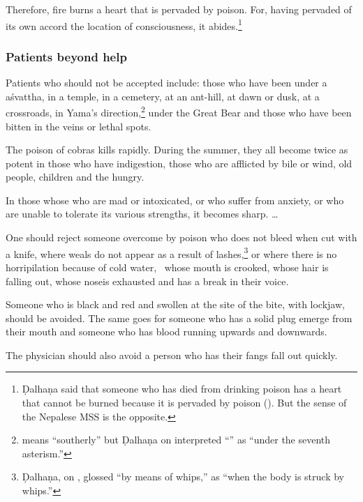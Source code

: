 \begin{translation}[resume]
\item[37]

Therefore, fire burns a heart that is pervaded by poison. For, having pervaded
of its own accord  the location of consciousness, it abides.\footnote{Ḍalhaṇa
    said that someone who has died from drinking poison has a heart that cannot
    be burned because it is pervaded by poison ().
    But the sense of the Nepalese MSS is the opposite.}

\subsubsection{Patients beyond help}

\item[38] Patients who should not be accepted include: those who have been
 under a \gls{aśvattha}, in a temple, in a cemetery, at an 
ant-hill, at
dawn or dusk, at a crossroads, in Yama's direction,\footnote{ means
    “southerly” but Ḍalhaṇa on  interpreted “” as “under the seventh asterism.”} under the Great Bear and 
    those who have been bitten in the veins or lethal spots.

\item[39]

The poison of cobras kills rapidly.  During the summer, they all become twice as 
potent in those who have indigestion, those who are afflicted by bile or wind, old 
people, children and the hungry.

\item[39.1]

In those whose who are mad or intoxicated, or who suffer from anxiety, or who
are unable to tolerate its various strengths, it becomes sharp.
\dag \ldots

\item[39.2]

\item [3.40cd--3.41]

One should reject someone overcome by poison who does not bleed when cut with
a knife, where weals do not appear as a result of lashes,\footnote{Ḍalhaṇa, on
    , glossed  “by means of whips,” as “when the
    body is struck by whips.”} %
    or where there is no horripilation because of cold water, \dag\ whose
    mouth is crooked, whose hair is falling out, whose \dag nose\dag is
    exhausted and has a break in their voice.

\item[3.42]

Someone who is black and red and swollen at the site of the bite, with lockjaw, should 
be avoided.  The same goes for someone who has a solid plug emerge from their 
mouth  and someone who has blood running upwards and downwards.

\item[3.43ab]

The physician should also avoid a person who has their fangs fall out quickly. 

\end{translation}